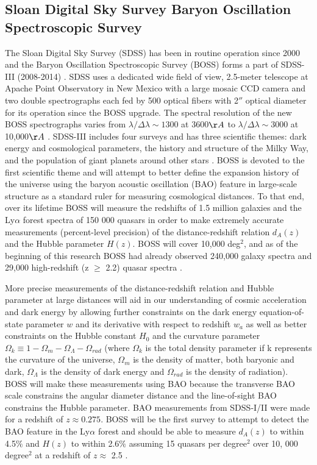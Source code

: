 \documentclass[preprint]{aastex}
\begin{document}
\subsection{Sloan Digital Sky Survey Baryon Oscillation Spectroscopic Survey}
The Sloan Digital Sky Survey (SDSS) has been in routine operation since 2000 and the Baryon Oscillation Spectroscopic Survey (BOSS) forms a part of SDSS-III (2008-2014) \citep{2011arXiv1101.1529E}.  SDSS uses a dedicated wide field of view, 2.5-meter telescope at Apache Point Observatory in New Mexico with a large mosaic CCD camera and two double spectrographs each fed by 500 optical fibers  with 2$''$ optical diameter for its operation since the BOSS upgrade.  The spectral resolution of the new BOSS spectrographs varies from $\lambda/\Delta\lambda \sim 1300$ at 3600$\AA$ to $\lambda/\Delta\lambda \sim 3000$ at 10,000$\AA$  \citep{2011arXiv1101.1529E}. SDSS-III includes four surveys and has three scientific themes: dark energy and cosmological parameters, the history and structure of the Milky Way, and the population of giant planets around other stars  \citep{2011arXiv1101.1529E}.  BOSS is devoted to the first scientific theme and will attempt to better define the expansion history of the universe using the baryon acoustic oscillation (BAO) feature in large-scale structure as a standard ruler for measuring cosmological distances.  To that end, over its lifetime BOSS will measure the redshifts of 1.5 million galaxies and the Ly$\alpha$ forest spectra of 150 000 quasars in order to make extremely accurate measurements (percent-level precision) of the distance-redshift relation $d_A(z)$ and the Hubble parameter $H(z)$.  BOSS will cover 10,000 deg$^2$, and as of the beginning of this research BOSS had already observed 240,000 galaxy spectra and 29,000 high-redshift (z $\geq$ 2.2) quasar spectra \citep{2011arXiv1101.1529E}.  
  
More precise measurements of the distance-redshift relation and Hubble parameter at large distances will aid in our understanding of cosmic acceleration and dark energy by allowing further constraints on the dark energy equation-of-state parameter $w$ and its derivative with respect to redshift $w_a$ as well as better constraints on the Hubble constant $H_0$ and the curvature parameter $\Omega_k \equiv 1 - \Omega_m - \Omega_{\Lambda} - \Omega_{rad}$ (where  $\Omega_k$ is the total density parameter if k represents the curvature of the universe,  $\Omega_m$ is the density of matter, both baryonic and dark,  $\Omega_{\Lambda}$ is the density of dark energy and $\Omega_{rad}$ is the density of radiation).  BOSS will make these measurements using BAO because the transverse BAO scale constrains the angular diameter distance and the line-of-sight BAO constrains the Hubble parameter.  BAO measurements from SDSS-I/II were made for a redshift of $z \approx 0.275$.  BOSS will be the first survey to attempt to detect the BAO feature in the Ly$\alpha$ forest and should be able to measure $d_A(z)$ to within 4.5$\%$ and $H(z)$ to within 2.6$\%$ assuming 15 quasars per degree$^2$ over 10, 000 degree$^2$ at a redshift of $z \approx$ 2.5 \citep{2011arXiv1101.1529E}.    
\end{document}
